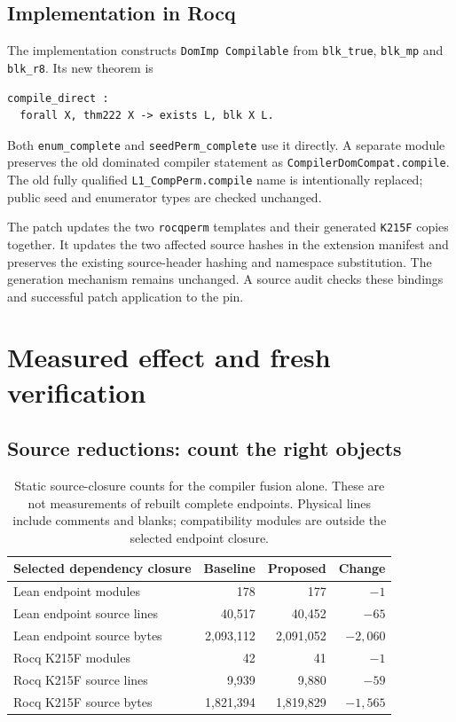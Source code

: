 \documentclass[11pt]{article}
\theoremstyle{definition}\newtheorem{definition}[theorem]{Definition}
\newcommand{\code}[1]{\texttt{#1}}
\begin{document}
\subsection{Implementation in Rocq}

The implementation constructs \code{DomImp Compilable} from
\code{blk\_true}, \code{blk\_mp} and \code{blk\_r8}. Its new theorem is
\begin{lstlisting}
compile_direct :
  forall X, thm222 X -> exists L, blk X L.
\end{lstlisting}
Both \code{enum\_complete} and \code{seedPerm\_complete} use it directly.
A separate module preserves the old dominated compiler statement as
\code{CompilerDomCompat.compile}. The old fully qualified
\code{L1\_CompPerm.compile} name is intentionally replaced; public seed and
enumerator types are checked unchanged.

The patch updates the two \code{rocqperm} templates and their generated
\code{K215F} copies together. It updates the two affected source hashes in the
extension manifest and preserves the existing source-header hashing and
namespace substitution. The generation mechanism remains unchanged. A source
audit checks these bindings and successful patch application to the pin.

\section{Measured effect and fresh verification}

\subsection{Source reductions: count the right objects}

\begin{table}[h]
\centering\small
\begin{tabular}{@{}lrrr@{}}
\toprule
Selected dependency closure & Baseline & Proposed & Change\\
\midrule
Lean endpoint modules & 178 & 177 & $-1$\\
Lean endpoint source lines & 40,517 & 40,452 & $-65$\\
Lean endpoint source bytes & 2,093,112 & 2,091,052 & $-2,060$\\
Rocq K215F modules & 42 & 41 & $-1$\\
Rocq K215F source lines & 9,939 & 9,880 & $-59$\\
Rocq K215F source bytes & 1,821,394 & 1,819,829 & $-1,565$\\
\bottomrule
\end{tabular}
\caption{Static source-closure counts for the compiler fusion alone. These are
not measurements of rebuilt complete endpoints. Physical lines include comments
and blanks; compatibility modules are outside the selected endpoint closure.}
\end{table}
\end{document}
